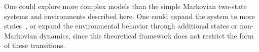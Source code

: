 \documentclass[entropy,article,
submit,
moreauthors,pdftex,10pt,a4paper]{mdpi}
\begin{document}
One could explore more complex models than the simple Markovian two-state systems and environments described here. 
One could expand the system to more states~\cite{Barato2014}, or expand the environmental behavior through additional states or non-Markovian dynamics, since this theoretical framework does not restrict the form of these transitions. 





\vspace{6pt} 

\end{document}
